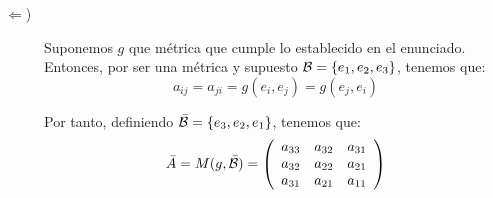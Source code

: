 \documentclass[12pt]{article}
\begin{document}
\begin{ejercicio}
\begin{enumerate}
\begin{description}
        \item [$\Longleftarrow$)] Suponemos $g$ que métrica que cumple lo establecido en el enunciado. Entonces, por ser una métrica y supuesto $\mathcal{B}=\{e_1, e_2, e_3\}$, tenemos que:
        \begin{equation*}
            a_{ij}=a_{ji}=g(e_i,e_j)=g(e_j,e_i)
        \end{equation*}

        Por tanto, definiendo $\bar{\mathcal{B}}=\{e_3,e_2,e_1\}$, tenemos que:
        \begin{equation*}
            \bar{A}=M(g,\bar{\mathcal{B}})=\left(\begin{array}{ccc}
                a_{33} & a_{32} & a_{31} \\
                a_{32} & a_{22} & a_{21} \\
                a_{31} & a_{21} & a_{11}
            \end{array}\right)
        \end{equation*}


\end{description}
\end{enumerate}
\end{ejercicio}
\end{document}
